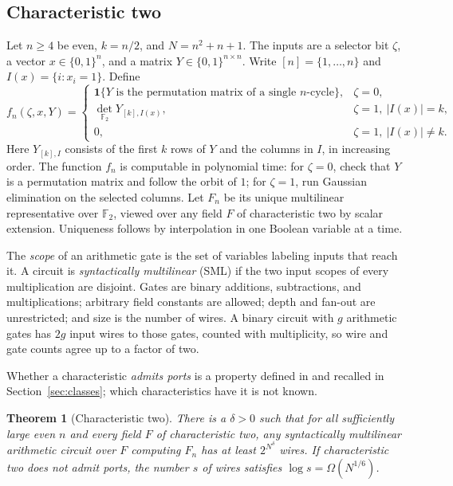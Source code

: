 \documentclass[11pt]{article}
\newtheorem{theorem}{Theorem}
\theoremstyle{remark}
\newcommand{\F}{\mathbb F}
\newcommand{\one}{\mathbf 1}
\begin{document}
\subsection{Characteristic two}\label{sec:function}
Let \(n\ge4\) be even, \(k=n/2\), and \(N=n^2+n+1\). The inputs are a
selector bit \(\zeta\), a vector \(x\in\{0,1\}^n\), and a matrix
\(Y\in\{0,1\}^{n\times n}\). Write \([n]=\{1,\ldots,n\}\) and
\(I(x)=\{i:x_i=1\}\). Define
\begin{equation}\label{eq:fn}
 f_n(\zeta,x,Y)=
 \begin{cases}
 \one\{Y\text{ is the permutation matrix of a single }n\text{-cycle}\},
       & \zeta=0,\\
 \det_{\F_2}Y_{[k],I(x)}, & \zeta=1,\ |I(x)|=k,\\
 0, & \zeta=1,\ |I(x)|\ne k .
 \end{cases}
\end{equation}
Here \(Y_{[k],I}\) consists of the first \(k\) rows of \(Y\) and the
columns in \(I\), in increasing order. The function \(f_n\) is computable
in polynomial time: for \(\zeta=0\), check that \(Y\) is a permutation
matrix and follow the orbit of \(1\); for \(\zeta=1\), run Gaussian
elimination on the selected columns. Let \(F_n\) be its unique multilinear
representative over \(\F_2\), viewed over any field \(F\) of
characteristic two by scalar extension. Uniqueness follows by
interpolation in one Boolean variable at a time.

The \emph{scope} of an arithmetic gate is the set of variables labeling
inputs that reach it. A circuit is \emph{syntactically multilinear} (SML)
if the two input scopes of every multiplication are disjoint. Gates are
binary additions, subtractions, and multiplications; arbitrary field
constants are allowed; depth and fan-out are unrestricted; and size is
the number of wires. A binary circuit with \(g\) arithmetic gates has
\(2g\) input wires to those gates, counted with multiplicity, so wire and
gate counts agree up to a factor of two.

Whether a characteristic \emph{admits ports} is a property defined in
\cite{hc} and recalled in Section~\ref{sec:classes}; which
characteristics have it is not known.

\begin{theorem}[Characteristic two]\label{thm:two}
There is a \(\delta>0\) such that for all sufficiently large even \(n\)
and every field \(F\) of characteristic two, any syntactically
multilinear arithmetic circuit over \(F\) computing \(F_n\) has at least
\(2^{N^\delta}\) wires. If characteristic two does not admit ports, the
number \(s\) of wires satisfies \(\log s=\Omega(N^{1/6})\).
\end{theorem}
\end{document}
